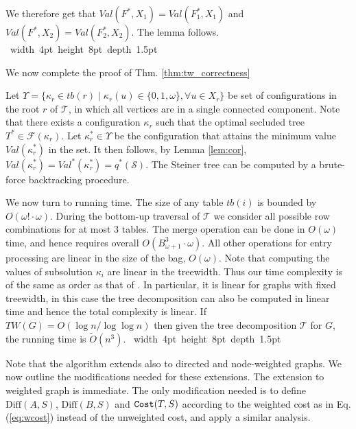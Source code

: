 \documentclass[12pt]{article}
\def\Cost{\mbox{\tt Cost}}
\def\Proof{\par\noindent{\bf Proof:~}}
\def\blackslug{\hbox{\hskip 1pt \vrule width 4pt height 8pt
    depth 1.5pt \hskip 1pt}}
\def\QED{\quad\blackslug\lower 8.5pt\null\par}
\newcommand{\DIFF}[0]{\mbox{Diff}}
\newcommand{\Terminals}[0]{\mathcal{S}}
\newcommand{\TD}[0]{\mathcal{T}}
\def\Cost{\mbox{\tt Cost}}
\begin{document}
We therefore get that $Val(F^{*}, X_1)=Val(F^{*}_1, X_1)$ and $Val(F^{*}, X_2)=Val(F^{*}_2, X_2)$. The lemma follows.
\QED
We now complete the proof of Thm. \ref{thm:tw_correctness}
\Proof
Let $\Upsilon=\{\kappa_r \in tb(r) \mid \kappa_r(u) \in \{0,1,\omega\}, \forall u \in X_r\}$ be set of configurations in the root $r$ of $\TD$, in which all vertices are in a single connected component. Note that there exists a configuration $\kappa_r$
such that the optimal secluded tree $T^{*} \in \mathcal{F}(\kappa_r)$.  Let $\kappa_r^{*} \in \Upsilon$  be the configuration that attains the minimum value $Val(\kappa_r^{*})$ in the set. It then follows, by Lemma \ref{lem:cor}, $Val(\kappa_r^{*})=Val^{*}(\kappa_r^{*})=q^{*}(\Terminals)$.
The Steiner tree can be computed by a brute-force backtracking procedure.
\par We now turn to running time.
The size of any table $tb(i)$ is bounded by $O(\omega!\cdot \omega)$.
During the bottom-up traversal of $\TD$ we consider all possible row combinations for at most 3 tables. The merge operation can be done in $O(\omega)$ time, and hence requires overall $O(B_{\omega+1}^{3} \cdot \omega)$. All other operations for entry processing  are linear in the size of the bag, $O(\omega)$.
Note that computing the values of subsolution $\kappa_i$ are linear in the treewidth. Thus our time complexity is of the same as order as that of \cite{ChimaniMZ11}. In particular, it is linear for graphs with fixed treewidth, in this case the tree decomposition can also be computed in linear time and hence the total complexity is linear. If $TW(G)=O(\log n /\log \log n)$ then given the tree decomposition $\TD$ for $G$, the running time is $\widetilde{O}(n^{3})$.
\QED

Note that the algorithm extends also to directed and node-weighted graphs.
We now outline the modifications needed for these extensions.
The extension to weighted graph is immediate. The only modification needed
is to
define $\DIFF(A,S)$, $\DIFF(B,S)$ and $\Cost(T,S)$
according to the weighted cost as in Eq. (\ref{eq:wcost})
instead of the unweighted cost,
and apply a similar analysis.
\end{document}
